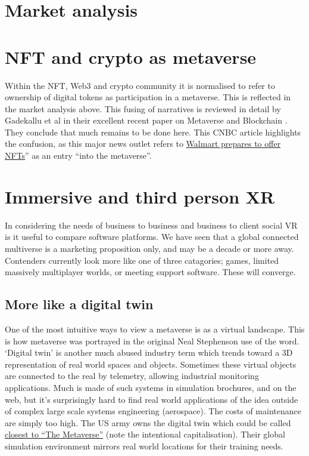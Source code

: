 \section{Market analysis}

\section{NFT and crypto as metaverse}
Within the NFT, Web3 and crypto community it is normalised to refer to ownership of digital tokens as participation in a metaverse. This is reflected in the market analysis above. This fusing of narratives is reviewed in detail by Gadekallu et al in their excellent recent paper on Metaverse and Blockchain \cite{gadekallu2022blockchain}. They conclude that much remains to be done here. This CNBC article highlights the confusion, as this major news outlet refers to \href{https://www.cnbc.com/2022/01/16/walmart-is-quietly-preparing-to-enter-the-metaverse.html}{Walmart prepares to offer NFTs}'' as an entry ``into the metaverse''.
\section{Immersive and third person XR}
In considering the needs of business to business and business to client social VR is it useful to compare software platforms. We have seen that a global connected multiverse is a marketing proposition only, and may be a decade or more away. Contenders currently look more like one of three catagories; games, limited massively multiplayer worlds, or meeting support software. These will converge.
\subsection{More like a digital twin}
One of the most intuitive ways to view a metaverse is as a virtual landscape. This is how metaverse was portrayed in the original Neal Stephenson use of the word. `Digital twin' is another much abused industry term which trends toward a 3D representation of real world spaces and objects. Sometimes these virtual objects are connected to the real by telemetry, allowing industrial monitoring applications. Much is made of such systems in simulation brochures, and on the web, but it's surprisingly hard to find real world applications of the idea outside of complex large scale systems engineering (aerospace). The costs of maintenance are simply too high. The US army owns the digital twin which could be called \href{https://www.army.mil/standto/archive/2018/03/26/}{closest to ``The Metaverse''} (note the intentional capitalisation). Their global simulation environment mirrors real world locations for their training needs. 
